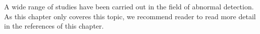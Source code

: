 A wide range of studies have been carried out in the field of abnormal detection. 
As this chapter only coveres this topic, 
we recommend reader to read more detail in the references of this chapter.







